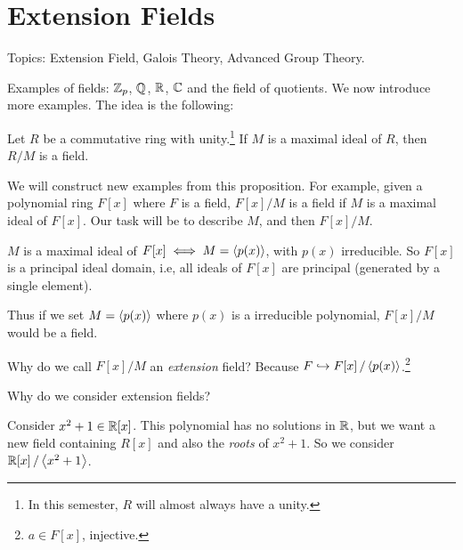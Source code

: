 \setcounter{chapter}{5}

\chapter{Extension Fields}

Topics: Extension Field, Galois Theory, Advanced Group Theory.

\setcounter{topic}{28}

Examples of fields: \(\mathbb{Z}_p\), \(\mathbb{Q}\), \(\mathbb{R}\), \(\mathbb{C}\) and the field of quotients. We now introduce more examples. The idea is the following:

\recall Let \(R\) be a commutative ring with unity.\footnote{In this semester, \(R\) will almost always have a unity.} If \(M\) is a maximal ideal of \(R\), then \(R/M\) is a field.

We will construct new examples from this proposition. For example, given a polynomial ring \(F[x]\) where \(F\) is a field, \(F[x]/M\) is a field if \(M\) is a maximal ideal of \(F[x]\). Our task will be to describe \(M\), and then \(F[x]/M\).

\recall \(M\) is a maximal ideal of \(F[x] \iff M = \left\langle p(x) \right\rangle\), with \(p(x)\) irreducible. So \(F[x]\) is a principal ideal domain, i.e, all ideals of \(F[x]\) are principal (generated by a single element).

Thus if we set \(M = \left\langle p(x) \right\rangle\) where \(p(x)\) is a irreducible polynomial, \(F[x]/M\) would be a field.

\question Why do we call \(F[x]/M\) an \textit{extension} field? Because \(F \hookrightarrow {F[x]} \operatorname{/} {\left\langle p(x) \right\rangle}\).\footnote{\(a \in F[x]\), injective.}

\question Why do we consider extension fields?

Consider \(x^2 + 1 \in \mathbb{R}[x]\). This polynomial has no solutions in \(\mathbb{R}\), but we want a new field containing \(R[x]\) and also the \textit{roots} of \(x^2 + 1\). So we consider \(\mathbb{R}[x] \operatorname{/} \left\langle x^2 + 1 \right\rangle\).

\pagebreak
